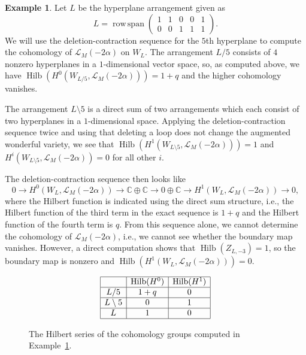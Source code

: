 \documentclass{amsart}
\theoremstyle{definition}
\newtheorem{example}[theorem]{Example}
\begin{document}
\begin{example}\label{ex:MK4}
Let $L$ be the hyperplane arrangement given as 
$$L = \operatorname{row \,span }\begin{pmatrix} 1 & 1 & 0 & 0 & 1 \\ 0 & 0 & 1 & 1 & 1\end{pmatrix}.$$
We will use the deletion-contraction sequence for the $5$th hyperplane to compute the cohomology of $\mathcal{L}_M(-2\alpha)$ on $W_L$. The arrangement $L/5$ consists of $4$ nonzero hyperplanes in a $1$-dimensional vector space, so, as computed above, we have $\operatorname{Hilb}(H^0(W_{L/5}, \mathcal{L}_M(-2\alpha))) = 1 + q$ and the higher cohomology vanishes.

The arrangement $L \setminus 5$ is a direct sum of two arrangements which each consist of two hyperplanes in a $1$-dimensional space. Applying the deletion-contraction sequence twice and using that deleting a loop does not change the augmented wonderful variety, we see that $\operatorname{Hilb}(H^1(W_{L \setminus 5}, \mathcal{L}_M(-2\alpha))) = 1$ and $H^i(W_{L \setminus 5}, \mathcal{L}_M(-2\alpha)) = 0$ for all other $i$. 



 The deletion-contraction sequence then looks like
$$0 \to H^0(W_{L}, \mathcal{L}_M(-2\alpha)) \to \mathbb{C} \oplus \mathbb{C} \to 0 \oplus \mathbb{C} \to H^1(W_{L}, \mathcal{L}_M(-2\alpha)) \to 0,$$
where the Hilbert function is indicated using the direct sum structure, i.e., the Hilbert function of the third term in the exact sequence is $1 + q$ and the Hilbert function of the fourth term is $q$. From this sequence alone, we cannot determine the cohomology of $\mathcal{L}_M(-2\alpha)$, i.e., we cannot see whether the boundary map vanishes. However, a direct computation shows that $\operatorname{Hilb}(Z_{L, -3}) = 1 $, so the boundary map is nonzero and $\operatorname{Hilb}(H^1(W_{L}, \mathcal{L}_{M}(-2\alpha))) = 0$. 
\end{example}
\begin{figure}
\[
\begin{array}{|c|c|c|}
\hline
 & \operatorname{Hilb}(H^0) & \operatorname{Hilb}(H^1) \\
\hline
L/5 & 1 + q & 0 \\ 
\hline 
L \setminus 5 & 0& 1\\ 
\hline
L & 1  & 0 \\ 
\hline
\end{array}
\]\caption{The Hilbert series of the cohomology groups computed in Example~\ref{ex:MK4}.}
\end{figure}
\end{document}
